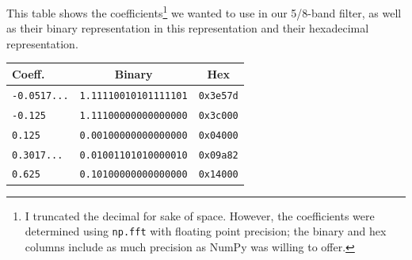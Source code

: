 \documentclass[12pt]{article}
\begin{document}
This table shows the coefficients\footnote{I truncated the decimal for sake of space. However, the coefficients were determined using \texttt{np.fft} with floating point precision; the binary and hex columns include as much precision as NumPy was willing to offer.} we wanted to use in our 5/8-band filter, as well as their binary representation in this representation and their hexadecimal representation.

\begin{center}
  \begin{tabular}{ l | c | c }
    Coeff. & Binary & Hex\\ \hline
    \texttt{-0.0517...}  &  \texttt{1.11110010101111101} & \texttt{0x3e57d}\\
    \texttt{-0.125} &  \texttt{1.11100000000000000} & \texttt{0x3c000}\\
    \texttt{0.125} & \texttt{0.00100000000000000} & \texttt{0x04000}\\
    \texttt{0.3017...} &  \texttt{0.01001101010000010} & \texttt{0x09a82}\\
    \texttt{0.625} &  \texttt{0.10100000000000000} & \texttt{0x14000}\\
   \end{tabular}
\end{center}
\end{document}
